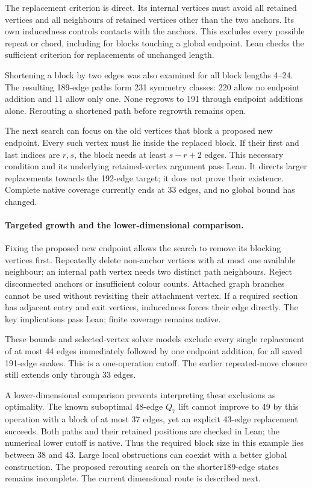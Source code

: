 \documentclass[11pt,a4paper]{article}
\begin{document}
The replacement criterion is direct. Its internal vertices must avoid
all retained vertices and all neighbours of retained vertices other
than the two anchors. Its own inducedness controls contacts with the
anchors. This excludes every possible repeat or chord, including for
blocks touching a global endpoint. Lean checks the sufficient criterion
for replacements of unchanged length.

Shortening a block by two edges was also examined for all block
lengths 4--24. The resulting 189-edge paths form 231 symmetry classes:
220 allow no endpoint addition and 11 allow only one. None regrows to
191 through endpoint additions alone. Rerouting a shortened path
before regrowth remains open.

The next search can focus on the old vertices that block a proposed
new endpoint. Every such vertex must lie inside the replaced block.
If their first and last indices are $r,s$, the block needs at least
$s-r+2$ edges. This necessary condition and its underlying retained-vertex
argument pass Lean. It directs larger replacements towards the
192-edge target; it does not prove their existence. Complete native
coverage currently ends at 33 edges, and no global bound has changed.


\paragraph{Targeted growth and the lower-dimensional comparison.}
Fixing the proposed new endpoint allows the search to remove its
blocking vertices first. Repeatedly delete non-anchor vertices with
at most one available neighbour; an internal path vertex needs two
distinct path neighbours. Reject disconnected anchors or insufficient
colour counts. Attached graph branches cannot be used without
revisiting their attachment vertex. If a required section has adjacent
entry and exit vertices, inducedness forces their edge directly.
The key implications pass Lean; finite coverage remains native.

These bounds and selected-vertex solver models exclude every single
replacement of at most 44 edges immediately followed by one endpoint
addition, for all saved 191-edge snakes. This is a one-operation
cutoff. The earlier repeated-move closure still extends only through
33 edges.

A lower-dimensional comparison prevents interpreting these exclusions
as optimality. The known suboptimal 48-edge $Q_7$ lift cannot improve
to 49 by this operation with a block of at most 37 edges, yet an
explicit 43-edge replacement succeeds. Both paths and their retained
positions are checked in Lean; the numerical lower cutoff is native.
Thus the required block size in this example lies between 38 and 43.
Large local obstructions can coexist with a better global construction.
The proposed rerouting search on the shorter189-edge states remains
incomplete. The current dimensional route is described next.
\end{document}
